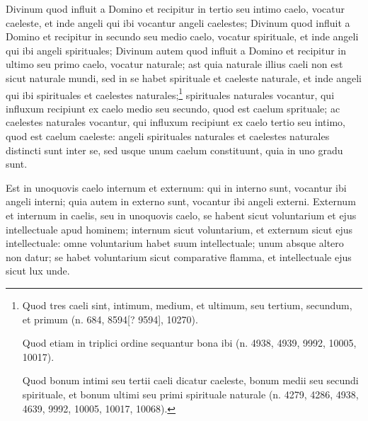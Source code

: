 \begin{topic}{31}
    Divinum quod influit a Domino et recipitur in tertio seu intimo caelo, vocatur caeleste, et inde angeli qui ibi
    vocantur angeli caelestes; Divinum quod influit a Domino et recipitur in secundo seu medio caelo, vocatur
    spirituale, et inde angeli qui ibi angeli spirituales; Divinum autem quod influit a Domino et recipitur in ultimo
    seu primo caelo, vocatur naturale; ast quia naturale illius caeli non est sicut naturale mundi, sed in se habet
    spirituale et caeleste naturale, et inde angeli qui ibi spirituales et caelestes naturales;\footnote{Quod tres caeli
    sint, intimum, medium, et ultimum, seu tertium, secundum, et primum (n. 684, 8594[? 9594], 10270).

    Quod etiam in triplici ordine sequantur bona ibi (n. 4938, 4939, 9992, 10005, 10017).

    Quod bonum intimi seu tertii caeli dicatur caeleste, bonum medii seu secundi spirituale, et bonum ultimi seu primi
    spirituale naturale (n. 4279, 4286, 4938, 4639, 9992, 10005, 10017, 10068).} spirituales naturales vocantur, qui
    influxum recipiunt ex caelo medio seu secundo, quod est caelum sprituale; ac caelestes naturales vocantur, qui
    influxum recipiunt ex caelo tertio seu intimo, quod est caelum caeleste: angeli spirituales naturales et caelestes
    naturales distincti sunt inter se, sed usque unum caelum constituunt, quia in uno gradu sunt.
\end{topic}

\begin{topic}{32}
    Est in unoquovis caelo internum et externum: qui in interno sunt, vocantur ibi angeli interni; quia autem in externo
    sunt, vocantur ibi angeli externi.
    Externum et internum in caelis, seu in unoquovis caelo, se habent sicut voluntarium et ejus intellectuale apud
    hominem; internum sicut voluntarium, et externum sicut ejus intellectuale: omne voluntarium habet suum
    intellectuale; unum absque altero non datur; se habet voluntarium sicut comparative flamma, et intellectuale ejus
    sicut lux unde.
\end{topic}

